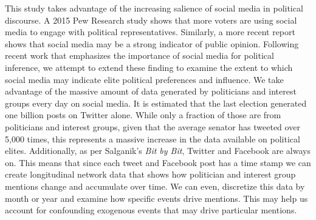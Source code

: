 \documentclass[dvips,12pt]{article}
\begin{document}
This study takes advantage of the increasing salience of social media in political discourse. A 2015 Pew Research study shows that more voters are using social media to engage with political representatives.\cite{RefWorks:doc:59e294d8e4b079ea75246fa4}  Similarly, a more recent report shows that social media may be a strong indicator of public opinion.\cite{RefWorks:doc:59e29579e4b07e3b24389ba8}  Following recent work that emphasizes the importance of social media for political inference, we attempt to extend these finding to examine the extent to which social media may indicate elite political preferences and influence. \cite{RefWorks:doc:59e2a60ce4b0b4635e033cd0} We take advantage of the massive amount of data generated by politicians and interest groups every day on social media. It is estimated that the last election generated one billion posts on Twitter alone.\cite{RefWorks:doc:59e29599e4b0ff0c7c11a860}  While only a fraction of those are from politicians and interest groups, given that the average senator has tweeted over 5,000 times, this represents a massive increase in the data available on political elites.\cite{RefWorks:doc:59e295cbe4b0e12588d9219a}  Additionally, as per Salganik’s \textit{Bit by Bit}, Twitter and Facebook are always on.\cite{RefWorks:doc:59e29742e4b07e3b24389bc5} This means that since each tweet and Facebook post has a time stamp we can create longitudinal network data that shows how politician and interest group mentions change and accumulate over time. We can even, discretize this data by month or year and examine how specific events drive mentions. This may help us account for confounding exogenous events that may drive particular mentions. 
 
\end{document}
